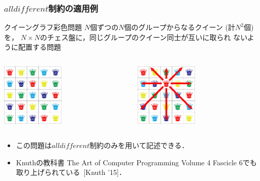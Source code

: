 \documentclass [dvipdfmx,11pt]{beamer}
\newcommand{\alldifferent}{$alldifferent$}
\begin{document}
\begin{frame}
    \frametitle{{\alldifferent}制約の適用例}
    \begin{block}{クイーングラフ彩色問題}
        $N$個ずつの$N$個のグループからなるクイーン (計$N^2$個) を，
        $N\times N$のチェス盤に，同じグループのクイーン同士が互いに取られ
        ないように配置する問題
    \end{block}
    \begin{exampleblock}{}\centering
        \begin{columns}
            \begin{column}{0.48\textwidth}\centering
                \includegraphics[width=3cm]{images/qgcp_5.jpg}
            \end{column}
            \begin{column}{0.48\textwidth}\centering
                \includegraphics[width=3cm]{images/qgcp_5_c.jpg}
            \end{column}
        \end{columns}
    \end{exampleblock}
    \begin{itemize}
        \item この問題は{\alldifferent}制約のみを用いて記述できる．
        \item Knuthの教科書 The Art of Computer Programming Volume 4 Fascicle 6でも
            取り上げられている~[Knuth '15]．
    \end{itemize}
\end{frame}
\end{document}

